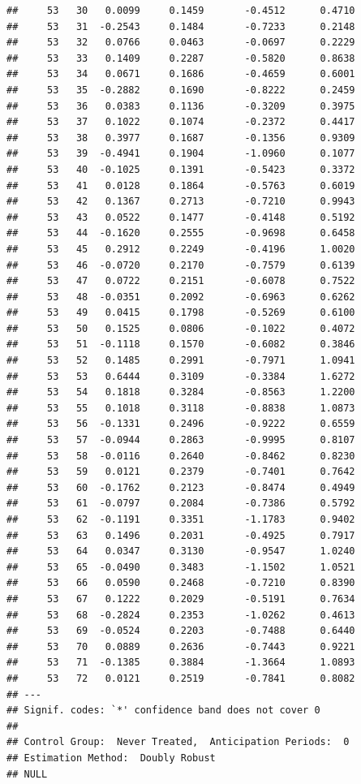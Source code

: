 \documentclass[
]{article}
\begin{document}
\begin{verbatim}
##     53   30   0.0099     0.1459       -0.4512      0.4710  
##     53   31  -0.2543     0.1484       -0.7233      0.2148  
##     53   32   0.0766     0.0463       -0.0697      0.2229  
##     53   33   0.1409     0.2287       -0.5820      0.8638  
##     53   34   0.0671     0.1686       -0.4659      0.6001  
##     53   35  -0.2882     0.1690       -0.8222      0.2459  
##     53   36   0.0383     0.1136       -0.3209      0.3975  
##     53   37   0.1022     0.1074       -0.2372      0.4417  
##     53   38   0.3977     0.1687       -0.1356      0.9309  
##     53   39  -0.4941     0.1904       -1.0960      0.1077  
##     53   40  -0.1025     0.1391       -0.5423      0.3372  
##     53   41   0.0128     0.1864       -0.5763      0.6019  
##     53   42   0.1367     0.2713       -0.7210      0.9943  
##     53   43   0.0522     0.1477       -0.4148      0.5192  
##     53   44  -0.1620     0.2555       -0.9698      0.6458  
##     53   45   0.2912     0.2249       -0.4196      1.0020  
##     53   46  -0.0720     0.2170       -0.7579      0.6139  
##     53   47   0.0722     0.2151       -0.6078      0.7522  
##     53   48  -0.0351     0.2092       -0.6963      0.6262  
##     53   49   0.0415     0.1798       -0.5269      0.6100  
##     53   50   0.1525     0.0806       -0.1022      0.4072  
##     53   51  -0.1118     0.1570       -0.6082      0.3846  
##     53   52   0.1485     0.2991       -0.7971      1.0941  
##     53   53   0.6444     0.3109       -0.3384      1.6272  
##     53   54   0.1818     0.3284       -0.8563      1.2200  
##     53   55   0.1018     0.3118       -0.8838      1.0873  
##     53   56  -0.1331     0.2496       -0.9222      0.6559  
##     53   57  -0.0944     0.2863       -0.9995      0.8107  
##     53   58  -0.0116     0.2640       -0.8462      0.8230  
##     53   59   0.0121     0.2379       -0.7401      0.7642  
##     53   60  -0.1762     0.2123       -0.8474      0.4949  
##     53   61  -0.0797     0.2084       -0.7386      0.5792  
##     53   62  -0.1191     0.3351       -1.1783      0.9402  
##     53   63   0.1496     0.2031       -0.4925      0.7917  
##     53   64   0.0347     0.3130       -0.9547      1.0240  
##     53   65  -0.0490     0.3483       -1.1502      1.0521  
##     53   66   0.0590     0.2468       -0.7210      0.8390  
##     53   67   0.1222     0.2029       -0.5191      0.7634  
##     53   68  -0.2824     0.2353       -1.0262      0.4613  
##     53   69  -0.0524     0.2203       -0.7488      0.6440  
##     53   70   0.0889     0.2636       -0.7443      0.9221  
##     53   71  -0.1385     0.3884       -1.3664      1.0893  
##     53   72   0.0121     0.2519       -0.7841      0.8082  
## ---
## Signif. codes: `*' confidence band does not cover 0
## 
## Control Group:  Never Treated,  Anticipation Periods:  0
## Estimation Method:  Doubly Robust
## NULL
\end{verbatim}
\end{document}
